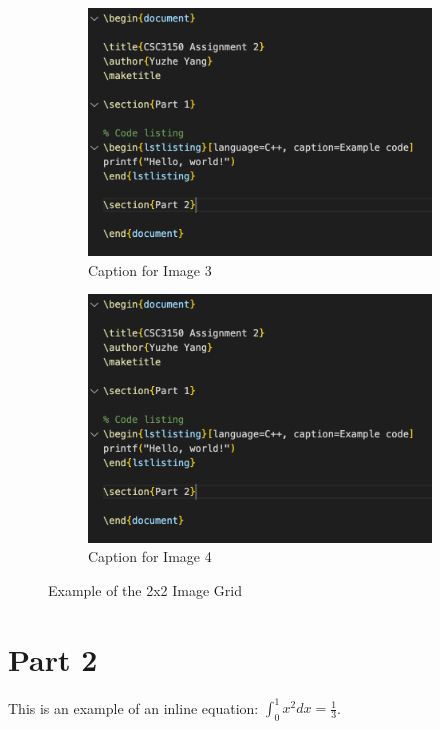 \documentclass[12pt,a4paper]{report}
\begin{document}
\begin{figure}[h]
    \begin{subfigure}{0.4\textwidth}
        \centering
        \includegraphics[width=\textwidth]{src/example.png}
        \caption{Caption for Image 3}
    \end{subfigure}
    \hfill
    \begin{subfigure}{0.4\textwidth}
        \centering
        \includegraphics[width=\textwidth]{src/example.png}
        \caption{Caption for Image 4}
    \end{subfigure}

    \caption{Example of the 2x2 Image Grid}
\end{figure}

\section{Part 2}
This is an example of an inline equation: $\int_{0}^{1} x^2 dx = \frac{1}{3}$.
\end{document}
